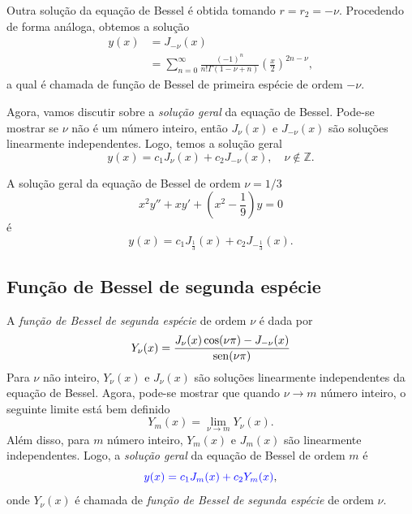 Outra solução da equação de Bessel é obtida tomando $r=r_2=-\nu$. Procedendo de forma análoga, obtemos a solução
\begin{align}
  y(x) &= J_{-\nu}(x)\\
       &= \sum_{n=0}^\infty \frac{(-1)^n}{n!\Gamma(1-\nu+n)}\left(\frac{x}{2}\right)^{2n-\nu},
\end{align}
a qual é chamada de função de Bessel de primeira espécie de ordem $-\nu$.

Agora, vamos discutir sobre a \emph{solução geral} da equação de Bessel. Pode-se mostrar se $\nu$ não é um número inteiro, então $J_\nu(x)$ e $J_{-\nu}(x)$ são soluções linearmente independentes. Logo, temos a solução geral
\begin{equation}
  y(x) = c_1J_\nu(x) + c_2J_{-\nu}(x),\quad \nu\not\in\mathbb{Z}.
\end{equation}

\begin{ex}
  A solução geral da equação de Bessel de ordem $\nu=1/3$
  \begin{equation}
    x^2y'' + xy' + \left(x^2 - \frac{1}{9}\right)y = 0
  \end{equation}
  é
  \begin{equation}
    y(x) = c_1J_{\frac{1}{3}}(x) + c_2J_{-\frac{1}{3}}(x).
  \end{equation}
\end{ex}

\subsection{Função de Bessel de segunda espécie}

A \emph{função de Bessel de segunda espécie} de ordem $\nu$ é dada por
\begin{equation}
  Y_\nu(x) = \frac{J_\nu(x)\cos(\nu\pi)-J_{-\nu}(x)}{\operatorname{sen}(\nu\pi)}
\end{equation}
Para $\nu$ não inteiro, $Y_\nu(x)$ e $J_\nu(x)$ são soluções linearmente independentes da equação de Bessel. Agora, pode-se mostrar que quando $\nu\to m$ número inteiro, o seguinte limite está bem definido
\begin{equation}
  Y_m(x) = \lim_{\nu\to m} Y_\nu(x).
\end{equation}
Além disso, para $m$ número inteiro, $Y_m(x)$ e $J_m(x)$ são linearmente independentes. Logo, a \emph{solução geral} da equação de Bessel de ordem $m$ é
\begin{equation}
  {\color{blue}y(x) = c_1J_m(x) + c_2Y_m(x)},
\end{equation}
onde $Y_\nu(x)$ é chamada de \emph{função de Bessel de segunda espécie} de ordem $\nu$.

